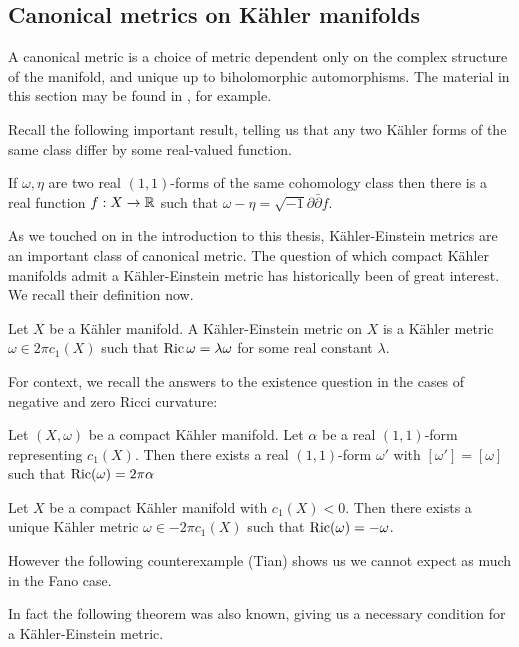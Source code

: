 \subsection{Canonical metrics on K\"ahler manifolds}
A canonical metric is a choice of metric dependent only on the complex structure of the manifold, and unique up to biholomorphic automorphisms. The material in this section may be found in \cite{szebook}, for example.

Recall the following important result, telling us that any two K\"ahler forms of the same class differ by some real-valued function.
\begin{lemma}
If \(\omega, \eta\) are two real \((1,1)\)-forms of the same cohomology class then there is a real function \(f: X \to \mathbb{R}\) such that \(\omega - \eta = \sqrt{-1} \partial \bar{\partial} f\).
\end{lemma}
As we touched on in the introduction to this thesis, K\"ahler-Einstein metrics are an important class of canonical metric. The question of which compact K\"ahler manifolds admit a K\"ahler-Einstein metric has historically been of great interest. We recall their definition now.
\begin{definition}
Let \(X\) be a K\"ahler manifold. A K\"ahler-Einstein metric on \(X\) is a K\"ahler metric \(\omega \in 2 \pi c_1(X)\) such that \(\mathop{\rm Ric}\nolimits \omega = \lambda \omega\) for some real constant \(\lambda\).
\end{definition}
For context, we recall the answers to the existence question in the cases of negative and zero Ricci curvature:
\begin{theorem}
Let \((X,\omega)\) be a compact K\"ahler manifold. Let \(\alpha\) be a real \((1,1)\)-form representing \(c_1(X)\). Then there exists a real \((1,1)\)-form \(\omega'\) with \([\omega'] = [\omega]\) such that \(\mathop{\rm Ric}\nolimits(\omega) = 2 \pi \alpha \)
\end{theorem}
\begin{theorem}
Let \(X\) be a compact K\"ahler manifold with \(c_1(X) < 0 \). Then there exists a unique K\"ahler metric \(\omega \in -2 \pi c_1(X)\) such that \(\mathop{\rm Ric}\nolimits(\omega) = -\omega\).
\end{theorem}
However the following counterexample (Tian) shows us we cannot expect as much in the Fano case.
\begin{example}

\end{example}
In fact the following theorem was also known, giving us a necessary condition for a K\"ahler-Einstein metric.
